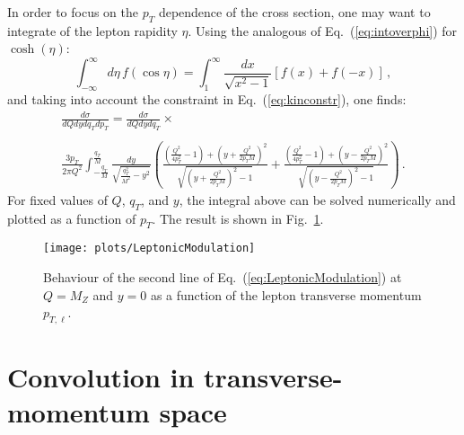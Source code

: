 \documentclass[10pt,a4paper]{article}
\begin{document}
In order to focus on the $p_T$ dependence of the cross section, one
may want to integrate of the lepton rapidity $\eta$. Using the
analogous of Eq.~(\ref{eq:intoverphi}) for $\cosh(\eta)$:
\begin{equation}\label{eq:intovereta}
\int_{-\infty}^{\infty}d\eta\, f(\cos\eta) = \int_{1}^{\infty}\frac{dx}{\sqrt{x^2-1}}\left[f(x)+f(-x)\right]\,,
\end{equation}
and taking into account the constraint in Eq.~(\ref{eq:kinconstr}),
one finds:
\begin{equation}\label{eq:LeptonicModulation}
\begin{array}{l}
\displaystyle \frac{d\sigma}{dQ dy dq_T dp_T} =\frac{d\sigma}{dQ dy
  dq_T} \times\\
\\
\displaystyle\frac
                                                          {3p_T}{2\pi
                                                          Q^2}\int_{-\frac{q_T}{M}}^{\frac{q_T}{M}}
  \frac{dy}{\sqrt{\frac{q_T^2}{M^2}-y^2}}\left(\frac{\left(\frac{Q^2}{4
  p_T^2}-1\right)+\left(y+\frac{Q^2}{2p_TM}\right)^2}{\sqrt{\left(y+\frac{Q^2}{2p_TM}\right)^2-1}}+\frac{\left(\frac{Q^2}{4
  p_T^2}-1\right)+\left(y-\frac{Q^2}{2p_TM}\right)^2}{\sqrt{\left(y-\frac{Q^2}{2p_TM}\right)^2-1}}\right)\,.
\end{array}
\end{equation}
For fixed values of $Q$, $q_T$, and $y$, the integral above can be
solved numerically and plotted as a function of $p_T$. The result is
shown in Fig.~\ref{fig:LeptonicModulation}.
\begin{figure}[t]
  \begin{centering}
    \texttt{[image: plots/LeptonicModulation]}
    \caption{Behaviour of the second line of
      Eq.~(\ref{eq:LeptonicModulation}) at $Q=M_Z$ and $y=0$ as a
      function of the lepton transverse momentum
      $p_{T,\ell}$.\label{fig:LeptonicModulation}}
  \end{centering}
\end{figure}

\section{Convolution in transverse-momentum space}
\end{document}
